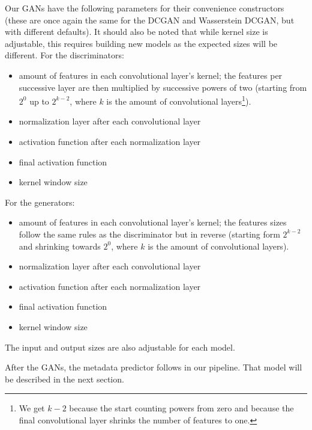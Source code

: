 Our GANs have the following parameters for their convenience
constructors (these are once again the same for the DCGAN and
Wasserstein DCGAN, but with different defaults). It should also be
noted that while kernel size is adjustable, this requires building new
models as the expected sizes will be different. For the discriminators:
\begin{itemize}
\item amount of features in each convolutional layer's kernel; the
  features per successive layer are then multiplied by successive
  powers of two (starting from $2^{0}$ up to $2^{k - 2}$, where $k$ is
  the amount of convolutional layers\footnote{We get $k - 2$ because
    the start counting powers from zero and because the final
    convolutional layer shrinks the number of features to one.}).
\item normalization layer after each convolutional layer
\item activation function after each normalization layer
\item final activation function
\item kernel window size
\end{itemize}
For the generators:
\begin{itemize}
\item amount of features in each convolutional layer's kernel; the
  features sizes follow the same rules as the discriminator but in
  reverse (starting form $2^{k - 2}$ and shrinking towards $2^{0}$,
  where $k$ is the amount of convolutional layers).
\item normalization layer after each convolutional layer
\item activation function after each normalization layer
\item final activation function
\item kernel window size
\end{itemize}
The input and output sizes are also adjustable for each model.

After the GANs, the metadata predictor follows in our pipeline. That
model will be described in the next section.


